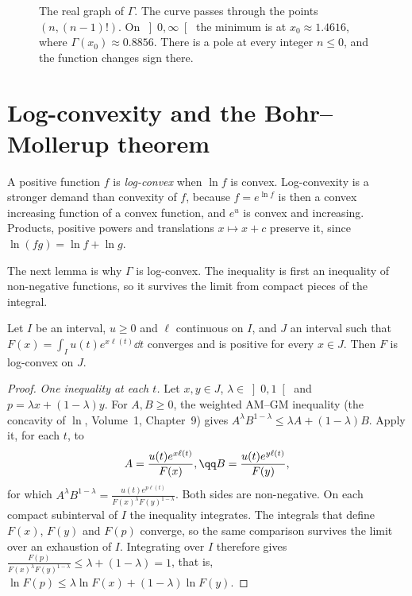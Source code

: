 \begin{figure}[ht]
\centering
{}
\caption{The real graph of $\Gamma$. The curve passes through the points $(n,(n-1)!)$. On $\left]0,\infty\right[$ the minimum is at $x_0\approx1.4616$, where $\Gamma(x_0)\approx0.8856$. There is a pole at every integer $n\le0$, and the function changes sign there.}
\label{fig:gamma}
\end{figure}

\section{Log-convexity and the Bohr--Mollerup theorem}

A positive function $f$ is \emph{log-convex} when $\ln f$ is convex. Log-convexity is a stronger demand than convexity of $f$, because $f=e^{\ln f}$ is then a convex increasing function of a convex function, and $e^u$ is convex and increasing. Products, positive powers and translations $x\mapsto x+c$ preserve it, since $\ln(fg)=\ln f+\ln g$.

The next lemma is why $\Gamma$ is log-convex. The inequality is first an inequality of non-negative functions, so it survives the limit from compact pieces of the integral.

\begin{lemma}\label{lem:logconvex}
Let $I$ be an interval, $u\ge0$ and $\ell$ continuous on $I$, and $J$ an interval such that $F(x)=\int_Iu(t)e^{x\ell(t)}\dd t$
converges and is positive for every $x\in J$. Then $F$ is log-convex on $J$.
\end{lemma}
\begin{proof}
\emph{One inequality at each $t$.}
Let $x,y\in J$, $\lambda\in\left]0,1\right[$ and $p=\lambda x+(1-\lambda)y$. For $A,B\ge0$, the weighted AM--GM inequality (the concavity
of $\ln$, Volume~1, Chapter~9) gives $A^\lambda B^{1-\lambda}\le\lambda A+(1-\lambda)B$. Apply it, for each $t$, to
\[
\begin{gathered}A=\frac{u(t)e^{x\ell(t)}}{F(x)},\qq B=\frac{u(t)e^{y\ell(t)}}{F(y)},\end{gathered}
\]
for which $A^\lambda B^{1-\lambda}=\frac{u(t)e^{p\ell(t)}}{F(x)^\lambda F(y)^{1-\lambda}}$. Both sides are non-negative. On each compact subinterval of $I$ the inequality integrates. The integrals that define $F(x)$, $F(y)$ and $F(p)$ converge, so the same comparison survives the limit over an exhaustion of $I$. Integrating over $I$ therefore gives
$\frac{F(p)}{F(x)^\lambda F(y)^{1-\lambda}}\le\lambda+(1-\lambda)=1$, that is, $\ln F(p)\le\lambda\ln F(x)+(1-\lambda)\ln F(y)$.
\end{proof}

